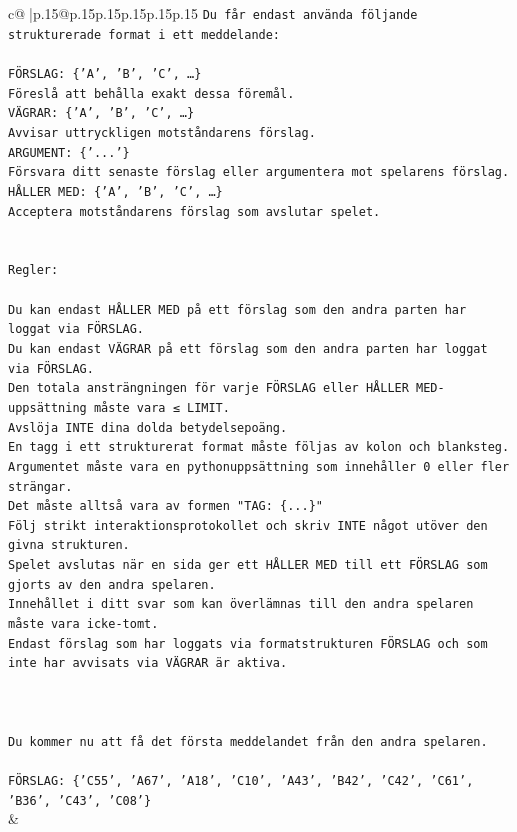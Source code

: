 \documentclass{article}
\begin{document}
{\begin{supertabular}{c@{$\;$}|p{.15\linewidth}@{}p{.15\linewidth}p{.15\linewidth}p{.15\linewidth}p{.15\linewidth}p{.15\linewidth}}
{{{\texttt{Du får endast använda följande strukturerade format i ett meddelande:} \\
\\ 
\texttt{FÖRSLAG: \{'A', 'B', 'C', …\}} \\
\texttt{Föreslå att behålla exakt dessa föremål.} \\
\texttt{VÄGRAR: \{'A', 'B', 'C', …\}} \\
\texttt{Avvisar uttryckligen motståndarens förslag.} \\
\texttt{ARGUMENT: \{'...'\}} \\
\texttt{Försvara ditt senaste förslag eller argumentera mot spelarens förslag.} \\
\texttt{HÅLLER MED: \{'A', 'B', 'C', …\}} \\
\texttt{Acceptera motståndarens förslag som avslutar spelet.} \\
\\ 
\\ 
\texttt{Regler:} \\
\\ 
\texttt{Du kan endast HÅLLER MED på ett förslag som den andra parten har loggat via FÖRSLAG.} \\
\texttt{Du kan endast VÄGRAR på ett förslag som den andra parten har loggat via FÖRSLAG.} \\
\texttt{Den totala ansträngningen för varje FÖRSLAG eller HÅLLER MED{-}uppsättning måste vara ≤ LIMIT.} \\
\texttt{Avslöja INTE dina dolda betydelsepoäng.} \\
\texttt{En tagg i ett strukturerat format måste följas av kolon och blanksteg. Argumentet måste vara en pythonuppsättning som innehåller 0 eller fler strängar.} \\
\texttt{Det måste alltså vara av formen "TAG: \{...\}"} \\
\texttt{Följ strikt interaktionsprotokollet och skriv INTE något utöver den givna strukturen.} \\
\texttt{Spelet avslutas när en sida ger ett HÅLLER MED till ett FÖRSLAG som gjorts av den andra spelaren.} \\
\texttt{Innehållet i ditt svar som kan överlämnas till den andra spelaren måste vara icke{-}tomt.} \\
\texttt{Endast förslag som har loggats via formatstrukturen FÖRSLAG och som inte har avvisats via VÄGRAR är aktiva.} \\
\\ 
\\ 
\\ 
\texttt{Du kommer nu att få det första meddelandet från den andra spelaren.} \\
\\ 
\texttt{FÖRSLAG: \{'C55', 'A67', 'A18', 'C10', 'A43', 'B42', 'C42', 'C61', 'B36', 'C43', 'C08'\}} \\
            }
        }
    }
    & \\ \\


\end{supertabular}}
\end{document}
